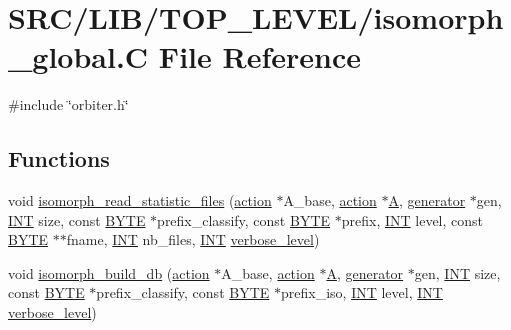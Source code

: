 \hypertarget{isomorph__global_8_c}{}\section{S\+R\+C/\+L\+I\+B/\+T\+O\+P\+\_\+\+L\+E\+V\+E\+L/isomorph\+\_\+global.C File Reference}
\label{isomorph__global_8_c}
{\ttfamily \#include \char`\"{}orbiter.\+h\char`\"{}}\newline
\subsection*{Functions}
\begin{DoxyCompactItemize}
\item 
void \mbox{\hyperlink{isomorph__global_8_c_a78a6ee9d7dee4708fc721374bdebfa83}{isomorph\+\_\+read\+\_\+statistic\+\_\+files}} (\mbox{\hyperlink{classaction}{action}} $\ast$A\+\_\+base, \mbox{\hyperlink{classaction}{action}} $\ast$\mbox{\hyperlink{simeon_8_c_a97833f04c3a9c008df5521a2fc291bb4}{A}}, \mbox{\hyperlink{classgenerator}{generator}} $\ast$gen, \mbox{\hyperlink{galois_8h_a09fddde158a3a20bd2dcadb609de11dc}{I\+NT}} size, const \mbox{\hyperlink{galois_8h_ab6cc7b4aeb6ea31aba2b3fbfc83ff5e6}{B\+Y\+TE}} $\ast$prefix\+\_\+classify, const \mbox{\hyperlink{galois_8h_ab6cc7b4aeb6ea31aba2b3fbfc83ff5e6}{B\+Y\+TE}} $\ast$prefix, \mbox{\hyperlink{galois_8h_a09fddde158a3a20bd2dcadb609de11dc}{I\+NT}} level, const \mbox{\hyperlink{galois_8h_ab6cc7b4aeb6ea31aba2b3fbfc83ff5e6}{B\+Y\+TE}} $\ast$$\ast$fname, \mbox{\hyperlink{galois_8h_a09fddde158a3a20bd2dcadb609de11dc}{I\+NT}} nb\+\_\+files, \mbox{\hyperlink{galois_8h_a09fddde158a3a20bd2dcadb609de11dc}{I\+NT}} \mbox{\hyperlink{simeon_8_c_a818073fbcc2f439e7c56952f67386122}{verbose\+\_\+level}})
\item 
void \mbox{\hyperlink{isomorph__global_8_c_a12eb18567e79a7978cb4f9e80d2055ac}{isomorph\+\_\+build\+\_\+db}} (\mbox{\hyperlink{classaction}{action}} $\ast$A\+\_\+base, \mbox{\hyperlink{classaction}{action}} $\ast$\mbox{\hyperlink{simeon_8_c_a97833f04c3a9c008df5521a2fc291bb4}{A}}, \mbox{\hyperlink{classgenerator}{generator}} $\ast$gen, \mbox{\hyperlink{galois_8h_a09fddde158a3a20bd2dcadb609de11dc}{I\+NT}} size, const \mbox{\hyperlink{galois_8h_ab6cc7b4aeb6ea31aba2b3fbfc83ff5e6}{B\+Y\+TE}} $\ast$prefix\+\_\+classify, const \mbox{\hyperlink{galois_8h_ab6cc7b4aeb6ea31aba2b3fbfc83ff5e6}{B\+Y\+TE}} $\ast$prefix\+\_\+iso, \mbox{\hyperlink{galois_8h_a09fddde158a3a20bd2dcadb609de11dc}{I\+NT}} level, \mbox{\hyperlink{galois_8h_a09fddde158a3a20bd2dcadb609de11dc}{I\+NT}} \mbox{\hyperlink{simeon_8_c_a818073fbcc2f439e7c56952f67386122}{verbose\+\_\+level}})
$$
\end{DoxyCompactItemize}

